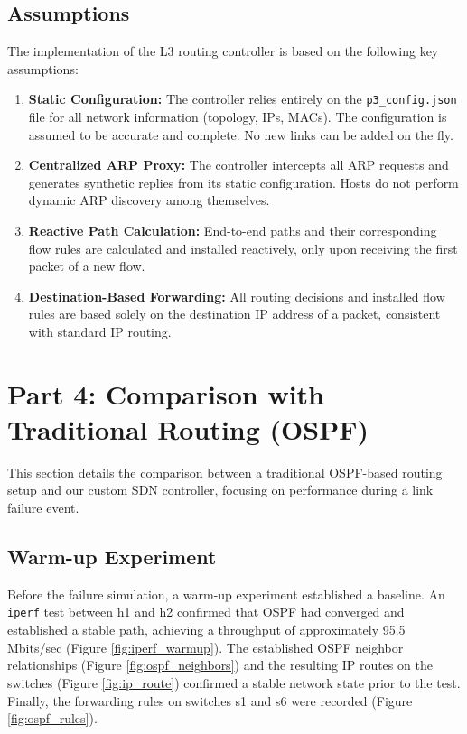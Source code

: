\documentclass[12pt]{article}
\begin{document}
\subsection{Assumptions}
The implementation of the L3 routing controller is based on the following key assumptions:
\begin{enumerate}
    \item \textbf{Static Configuration:} The controller relies entirely on the \texttt{p3\_config.json} file for all network information (topology, IPs, MACs). The configuration is assumed to be accurate and complete. No new links can be added on the fly.

    \item \textbf{Centralized ARP Proxy:} The controller intercepts all ARP requests and generates synthetic replies from its static configuration. Hosts do not perform dynamic ARP discovery among themselves.

    \item \textbf{Reactive Path Calculation:} End-to-end paths and their corresponding flow rules are calculated and installed reactively, only upon receiving the first packet of a new flow.

    \item \textbf{Destination-Based Forwarding:} All routing decisions and installed flow rules are based solely on the destination IP address of a packet, consistent with standard IP routing.
\end{enumerate}
\section{Part 4: Comparison with Traditional Routing (OSPF)}

This section details the comparison between a traditional OSPF-based routing setup and our custom SDN controller, focusing on performance during a link failure event.

\subsection{Warm-up Experiment}

Before the failure simulation, a warm-up experiment established a baseline. An \texttt{iperf} test between h1 and h2 confirmed that OSPF had converged and established a stable path, achieving a throughput of approximately 95.5 Mbits/sec (Figure \ref{fig:iperf_warmup}). The established OSPF neighbor relationships (Figure \ref{fig:ospf_neighbors}) and the resulting IP routes on the switches (Figure \ref{fig:ip_route}) confirmed a stable network state prior to the test. Finally, the forwarding rules on switches s1 and s6 were recorded (Figure \ref{fig:ospf_rules}).
\end{document}
